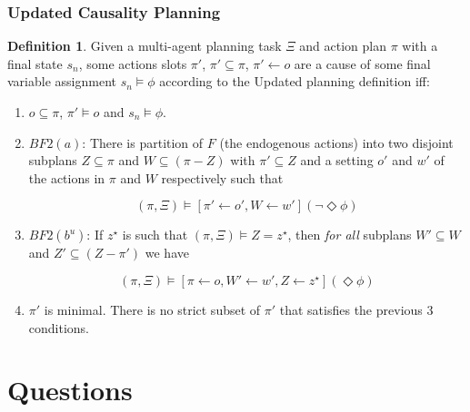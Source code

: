 \documentclass{beamer}
\theoremstyle{plain}
\theoremstyle{definition}
\newtheorem{defn}[thm]{Definition} %
\begin{document}
\begin{frame}
\frametitle{Updated Causality Planning}
\small
\begin{defn}
Given a multi-agent planning task $\Xi$ and action plan $\pi$ with a final state $s_n$, some actions slots $\pi'$, $\pi' \subseteq \pi$, $\pi' \leftarrow o$ are a cause of some final variable assignment $s_n \models \phi$ according to the Updated planning definition iff:
\begin{enumerate}
\item  $o \subseteq \pi$, $\pi' \models o$ and $s_n \models \phi$.



\item $BF2(a)$: There is partition of $F$ (the endogenous actions) into two disjoint subplans $Z \subseteq \pi$ and $W \subseteq (\pi - Z)$ with $\pi' \subseteq Z$ and a setting $o'$ and $w'$ of the actions in $\pi$ and $W$ respectively such that

\[
(\pi, \Xi) \models [\pi' \leftarrow o', W \leftarrow w'](\lnot \Diamond \phi)
\]

\item $BF2(b^u)$: If $z^\star$ is such that $(\pi, \Xi) \models Z = z^\star$, then \textit{for all} subplans $W' \subseteq W$ and $Z' \subseteq (Z - \pi')$ we have

\[
(\pi, \Xi) \models [\pi \leftarrow o, W' \leftarrow w', Z \leftarrow z^\star](\Diamond \phi)
\]

\item $\pi'$ is minimal. There is no strict subset of $\pi'$ that satisfies the previous 3 conditions.
\end{enumerate}
\end{defn}

\end{frame}

\section{Questions}
\end{document}
